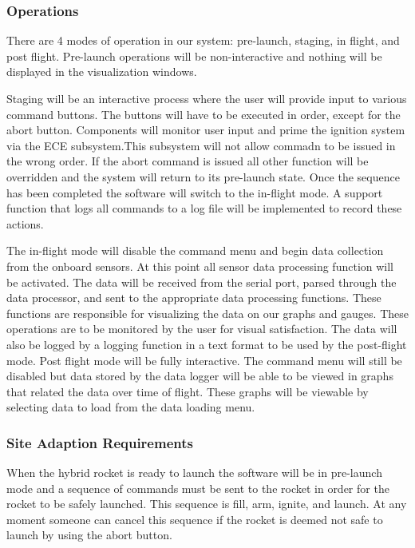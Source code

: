 \documentclass[10pt,draftclsnofoot,onecolumn,compsoc]{IEEEtran}
\begin{document}
\subsubsection {Operations}
There are 4 modes of operation in our system: pre-launch, staging, in flight, and post flight.  Pre-launch operations will be non-interactive and nothing will be displayed in the visualization windows. \par
	Staging will be an interactive process where the user will provide input to various command buttons. The buttons will have to be executed in order, except for the abort button. Components will monitor user input and prime the ignition system via the ECE subsystem.This subsystem will not allow commadn to be issued in the wrong order. If the abort command is issued all other function will be overridden and the system will return to its pre-launch state. Once the sequence has been completed the software will switch to the in-flight mode. A support function that logs all commands to a log file will be implemented to record these actions.\par
	The in-flight mode will disable the command menu and begin data collection from the onboard sensors. At this point all sensor data processing function will be activated. The data will be received from the serial port, parsed through the data processor, and sent to the appropriate data processing functions. These functions are responsible for visualizing the data on our graphs and gauges. These operations are to be monitored by the user for visual satisfaction.  The data will also be logged by a logging function in a text format to be used by the post-flight mode.
	Post flight mode will be fully interactive. The command menu will still be disabled but data stored by the data logger will be able to be viewed in graphs that related the data over time of flight. These graphs will be viewable by selecting data to load from the data loading menu.\par

\subsubsection{Site Adaption Requirements}
When the hybrid rocket is ready to launch the software will be in pre-launch mode and a sequence of commands must be sent to the rocket in order for the rocket to be safely launched. This sequence is fill, arm, ignite, and launch. At any moment someone can cancel this sequence if the rocket is deemed not safe to launch by using the abort button.
\end{document}
